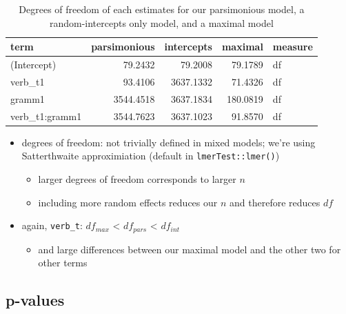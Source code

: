 \documentclass[
  letterpaper,
  DIV=11,
  numbers=noendperiod]{scrartcl}
\providecommand{\tightlist}{%
  \setlength{\itemsep}{0pt}\setlength{\parskip}{0pt}}\usepackage{longtable,booktabs,array}
\begin{document}
\hypertarget{tbl-df}{}
\begin{longtable}[t]{lrrrl}
\caption{\label{tbl-df}Degrees of freedom of each estimates for our parsimonious model, a
random-intercepts only model, and a maximal model }\tabularnewline

\toprule
term & parsimonious & intercepts & maximal & measure\\
\midrule
(Intercept) & 79.2432 & 79.2008 & 79.1789 & df\\
verb\_t1 & 93.4106 & 3637.1332 & 71.4326 & df\\
gramm1 & 3544.4518 & 3637.1834 & 180.0819 & df\\
verb\_t1:gramm1 & 3544.7623 & 3637.1023 & 91.8570 & df\\
\bottomrule
\end{longtable}

\begin{itemize}
\tightlist
\item
  degrees of freedom: not trivially defined in mixed models; we're using
  Satterthwaite approximiation (default in \texttt{lmerTest::lmer()})

  \begin{itemize}
  \tightlist
  \item
    larger degrees of freedom corresponds to larger \(n\)
  \item
    including more random effects reduces our \(n\) and therefore
    reduces \(df\)
  \end{itemize}
\item
  again, \texttt{verb\_t}: \(df_{max}\) \textless{} \(df_{pars}\)
  \textless{} \(df_{int}\)

  \begin{itemize}
  \tightlist
  \item
    and large differences between our maximal model and the other two
    for other terms
  \end{itemize}
\end{itemize}

\hypertarget{p-values}{%
\subsection{p-values}\label{p-values}}
\end{document}
